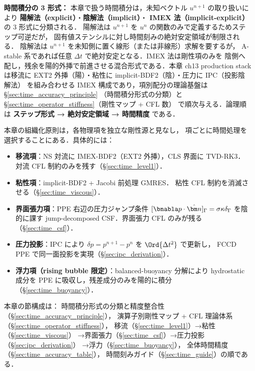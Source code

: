 \noindent\textbf{時間積分の 3 形式：}
本章で扱う時間積分は，未知ベクトル $u^{n+1}$ の取り扱いにより
\textbf{陽解法（explicit）}・\textbf{陰解法（implicit）}・
\textbf{IMEX 法（implicit-explicit）}の 3 形式に分類される．
陽解法は $u^{n+1}$ を $u^n$ の関数のみで定義するためステップ可逆だが，
固有値ステンシルに対し時間刻みの絶対安定領域が制限される．
陰解法は $u^{n+1}$ を未知側に置く線形（または非線形）求解を要するが，
A-stable 系であれば任意 $\Delta t$ で絶対安定となる．IMEX 法は剛性項のみを
陰側へ配し，残余を陽的外挿で前進させる混合形式である．本章 ch13 production stack
は移流に EXT2 外挿（陽）・粘性に implicit-BDF2（陰）・圧力に IPC（投影陰解法）
を組み合わせる IMEX 構成であり，項別配分の理論基盤は §\ref{sec:time_accuracy_principle}
（時間積分形式の分類）と §\ref{sec:time_operator_stiffness}（剛性マップ + CFL 数）
で順次与える．論理順は \textbf{ステップ形式 → 絶対安定領域 → 時間精度} である．

本章の組織化原則は，各物理項を独立な剛性源と見なし，
項ごとに時間処理を選択することにある．具体的には：

\begin{itemize}[leftmargin=2em]
  \item \textbf{移流項}：NS 対流に IMEX-BDF2（EXT2 外挿），CLS 界面に TVD-RK3．
        対流 CFL 制約のみを残す（§\ref{sec:time_level1}）．
  \item \textbf{粘性項}：implicit-BDF2 + Jacobi 前処理 GMRES．
        粘性 CFL 制約を消滅させる（§\ref{sec:time_viscous}）．
  \item \textbf{界面張力項}：PPE 右辺の圧力ジャンプ条件
        $[\bnabla p\cdot\hat{\bm n}]_\Gamma=\sigma\kappa\delta_\Gamma$ を陰的に課す
        jump-decomposed CSF．界面張力 CFL のみが残る（§\ref{sec:time_csf}）．
  \item \textbf{圧力投影}：IPC により $\delta p = p^{n+1} - p^n$ を $\Ord{\Delta t^2}$ で更新し，
        FCCD PPE で同一面投影を実現（§\ref{sec:ipc_derivation}）．
  \item \textbf{浮力項（rising bubble 限定）}：balanced-buoyancy 分解により
        hydrostatic 成分を PPE に吸収し，残差成分のみを陽的に積分
        （§\ref{sec:time_buoyancy}）．
\end{itemize}

本章の節構成は：
時間積分形式の分類と精度整合性（§\ref{sec:time_accuracy_principle}），
演算子別剛性マップ + CFL 理論体系（§\ref{sec:time_operator_stiffness}），
移流（§\ref{sec:time_level1}）→粘性（§\ref{sec:time_viscous}）
→界面張力（§\ref{sec:time_csf}）→圧力投影（§\ref{sec:ipc_derivation}）
→浮力（§\ref{sec:time_buoyancy}），
全体時間精度（§\ref{sec:time_accuracy_table}），
時間刻みガイド（§\ref{sec:time_guide}）の順である．

